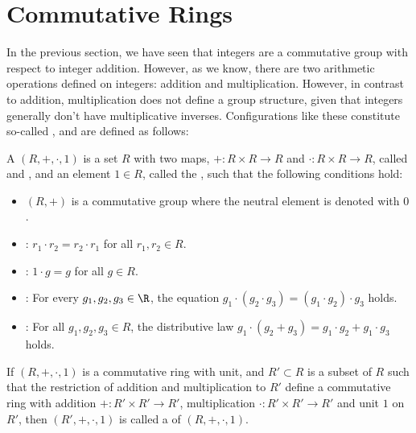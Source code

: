 \section{Commutative Rings}\label{sec:rings}
In the previous section, we have seen that integers are a commutative group with respect to integer addition. However, as we know, there are two arithmetic operations defined on integers: addition and multiplication. However, in contrast to addition, multiplication does not define a group structure, given that integers generally don't have multiplicative inverses. Configurations like these constitute so-called , and are defined as follows: 

\begin{definition}\label{def:comm-ring-unit}
A  $ (R, +, \cdot, 1) $ is a set $R$ with two maps, $ +: R \times R \to R $ and $ \cdot: R \times R \to R $, called  and , and an element $1\in R$, called the , such that the following conditions hold:
\begin{itemize}
\item $ (R, +) $ is a commutative group where the neutral element is denoted  with $ 0 $.
\item {}: $r_1\cdot r_2 = r_2\cdot r_1$ for all $r_1, r_2\in R$.
\item {}: $1\cdot g=g$ for all $g\in R$.
\item {}: For every $g_1,g_2,g_3\in\R$, the equation
$g_1\cdot(g_2\cdot g_3) = (g_1\cdot g_2)\cdot g_3$ holds.
\item {}: For all $ g_1, g_2, g_3 \in R $, the distributive law
$ g_1 \cdot \left (g_2 + g_3 \right) = g_1 \cdot g_2 + g_1 \cdot g_3$ holds.
\end{itemize}
If $(R,+,\cdot,1)$ is a commutative ring with unit, and $R'\subset R$ is a subset of $R$ such that the restriction of addition and multiplication to $R'$ define a commutative ring with addition $+: R'\times R' \to R'$, multiplication $\cdot: R'\times R' \to R'$ and unit $1$ on $R'$, then $(R',+,\cdot,1)$ is called a  of $(R,+,\cdot,1)$.
\end{definition}
